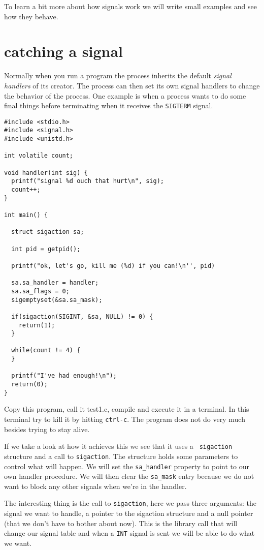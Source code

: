 \documentclass[a4paper,11pt]{article}
\begin{document}
To learn a bit more about how signals work we will write small
examples and see how they behave.

\section{catching a signal}

Normally when you run a program the process inherits the default
{\em signal handlers} of its creator. The process can then set its own
signal handlers to change the behavior of the process. One example is
when a process wants to do some final things before terminating when
it receives the {\tt SIGTERM} signal. 

\begin{lstlisting}
#include <stdio.h>
#include <signal.h>
#include <unistd.h>

int volatile count;

void handler(int sig) {
  printf("signal %d ouch that hurt\n", sig);
  count++;
}

int main() { 

  struct sigaction sa;

  int pid = getpid();

  printf("ok, let's go, kill me (%d) if you can!\n'', pid)

  sa.sa_handler = handler;
  sa.sa_flags = 0;
  sigemptyset(&sa.sa_mask);

  if(sigaction(SIGINT, &sa, NULL) != 0) {
    return(1);
  }
  
  while(count != 4) {
  }

  printf("I've had enough!\n");
  return(0);
}
\end{lstlisting}

Copy this program, call it test1.c, compile and execute it in a terminal. In
this terminal try to kill it by hitting {\tt ctrl-c}. The program does
not do very much besides trying to stay alive.

If we take a look at how it achieves this we see that it uses a {\tt
sigaction} structure and a call to {\tt sigaction}. The structure
holds some parameters to control what will happen. We will set the
{\tt sa\_handler} property to point to our own handler procedure. We
will then clear the {\tt sa\_mask} entry because we do not want to
block any other signals when we're in the handler. 

The interesting thing is the call to {\tt sigaction}, here we pass
three arguments: the signal we want to handle, a pointer to the
sigaction structure and a null pointer (that we don't have to bother
about now). This is the library call that will change our signal
table and when a {\tt INT} signal is sent we will be able to do what
we want.
\end{document}

